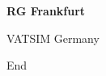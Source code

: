 \documentclass[10pt,a4paper,landscape]{article}
\begin{document}
\setlength{\parindent}{0pt}

\begin{center}
\huge
\vspace{1cm}

\textbf{RG Frankfurt}

\normalsize
VATSIM Germany
\end{center}


\newpage
\mbox{}
\newpage
\mbox{}
\newpage
\mbox{}
\newpage
\mbox{}
\newpage
\mbox{}
\newpage
\mbox{}


\newpage 		%
\hspace{0pt}	%
\vfill			%
\centering		%
End				%
\vfill			%
\hspace{0pt}	%
\end{document}
